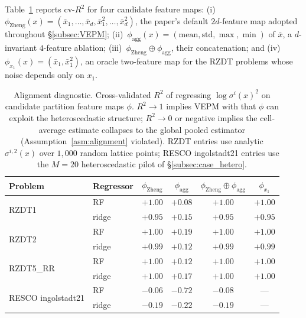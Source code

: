 \documentclass[12pt]{article}
\theoremstyle{plain}
\theoremstyle{definition}
\theoremstyle{remark}
\begin{document}
Table~\ref{tab:alignment} reports cv-$R^{2}$ for four candidate feature
maps: (i)~$\phi_{\mathrm{Zheng}}(x) = (\bar x_1,\ldots,\bar x_d,\bar x_1^2,\ldots,\bar x_d^2)$,
the paper's default $2d$-feature map adopted throughout
\S\ref{subsec:VEPM}; (ii)~$\phi_{\mathrm{agg}}(x) = (\mathrm{mean},\mathrm{std},\max,\min)$
of $\bar x$, a $d$-invariant $4$-feature ablation;
(iii)~$\phi_{\mathrm{Zheng}}\oplus\phi_{\mathrm{agg}}$, their
concatenation; and (iv)~$\phi_{x_1}(x) = (\bar x_1,\bar x_1^{2})$, an
oracle two-feature map for the RZDT problems whose noise depends only on
$x_1$.

\begin{table}[t]
  \centering
  \caption{Alignment diagnostic.  Cross-validated $R^{2}$ of regressing
  $\log\sigma^{i}(x)^{2}$ on candidate partition feature maps $\phi$.
  $R^{2}\to 1$ implies VEPM with that $\phi$ can exploit the
  heteroscedastic structure; $R^{2}\to 0$ or negative implies the
  cell-average estimate collapses to the global pooled estimator
  (Assumption~\ref{asm:alignment} violated).  RZDT entries use
  analytic $\sigma^{i,2}(x)$ over $1{,}000$ random lattice points;
  RESCO ingolstadt21 entries use the $M=20$ heteroscedastic pilot of
  \S\ref{subsec:case_hetero}.}
  \label{tab:alignment}
  \small
  \begin{tabular}{l l c c c c}
    \toprule
    Problem & Regressor & $\phi_{\mathrm{Zheng}}$ & $\phi_{\mathrm{agg}}$ &
        $\phi_{\mathrm{Zheng}}\oplus\phi_{\mathrm{agg}}$ & $\phi_{x_1}$ \\
    \midrule
    \multirow{2}{*}{RZDT1}     & RF    & $+1.00$ & $+0.08$ & $+1.00$ & $+1.00$ \\
                               & ridge & $+0.95$ & $+0.15$ & $+0.95$ & $+0.95$ \\
    \multirow{2}{*}{RZDT2}     & RF    & $+1.00$ & $+0.19$ & $+1.00$ & $+1.00$ \\
                               & ridge & $+0.99$ & $+0.12$ & $+0.99$ & $+0.99$ \\
    \multirow{2}{*}{RZDT5\_RR} & RF    & $+1.00$ & $+0.12$ & $+1.00$ & $+1.00$ \\
                               & ridge & $+1.00$ & $+0.17$ & $+1.00$ & $+1.00$ \\
    \midrule
    \multirow{2}{*}{RESCO ingolstadt21} & RF    & $-0.06$ & $-0.72$ & $-0.08$ & --- \\
                                  & ridge & $-0.19$ & $-0.22$ & $-0.19$ & --- \\
    \bottomrule
  \end{tabular}
\end{table}
\end{document}
